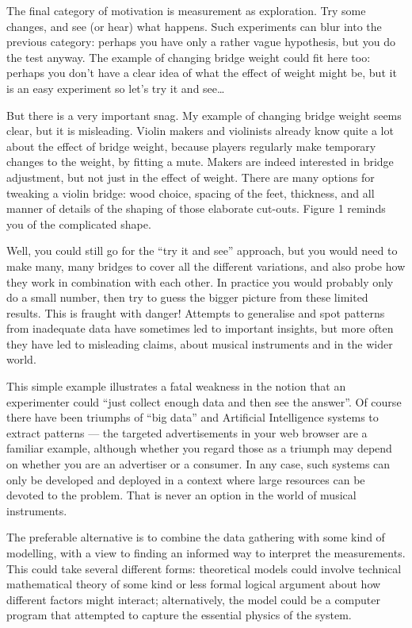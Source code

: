   The final category of motivation is measurement as exploration. Try some 
  changes, and see (or hear) what happens. Such experiments can blur into the 
  previous category: perhaps you have only a rather vague hypothesis, but you 
  do the test anyway. The example of changing bridge weight could fit here too: 
  perhaps you don’t have a clear idea of what the effect of weight might be, 
  but it is an easy experiment so let’s try it and see… 

  But there is a very important snag. My example of changing bridge weight 
  seems clear, but it is misleading. Violin makers and violinists already know 
  quite a lot about the effect of bridge weight, because players regularly make 
  temporary changes to the weight, by fitting a mute. Makers are indeed 
  interested in bridge adjustment, but not just in the effect of weight. There 
  are many options for tweaking a violin bridge: wood choice, spacing of the 
  feet, thickness, and all manner of details of the shaping of those elaborate 
  cut-outs. Figure 1 reminds you of the complicated shape. 

  Well, you could still go for the “try it and see” approach, but you would 
  need to make many, many bridges to cover all the different variations, and 
  also probe how they work in combination with each other. In practice you 
  would probably only do a small number, then try to guess the bigger picture 
  from these limited results. This is fraught with danger! Attempts to 
  generalise and spot patterns from inadequate data have sometimes led to 
  important insights, but more often they have led to misleading claims, about 
  musical instruments and in the wider world. 

  This simple example illustrates a fatal weakness in the notion that an 
  experimenter could “just collect enough data and then see the answer”. Of 
  course there have been triumphs of “big data” and Artificial Intelligence 
  systems to extract patterns — the targeted advertisements in your web browser 
  are a familiar example, although whether you regard those as a triumph may 
  depend on whether you are an advertiser or a consumer. In any case, such 
  systems can only be developed and deployed in a context where large resources 
  can be devoted to the problem. That is never an option in the world of 
  musical instruments. 

  The preferable alternative is to combine the data gathering with some kind of 
  modelling, with a view to finding an informed way to interpret the 
  measurements. This could take several different forms: theoretical models 
  could involve technical mathematical theory of some kind or less formal 
  logical argument about how different factors might interact; alternatively, 
  the model could be a computer program that attempted to capture the essential 
  physics of the system. 

